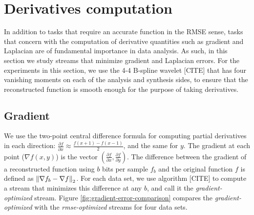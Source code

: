 \section{Derivatives computation}

In addition to tasks that require an accurate function in the RMSE sense, tasks that concern with
the computation of derivative quantities such as gradient and Laplacian are of fundamental
importance in data analysis. As such, in this section we study streams that minimize gradient and
Laplacian errors. For the experiments in this section, we use the 4-4 B-spline wavelet [CITE] that
has four vanishing moments on each of the analysis and synthesis sides, to ensure that the
reconstructed function is smooth enough for the purpose of taking derivatives.

\subsection{Gradient}

We use the two-point central difference formula for computing partial derivatives in each
direction: $\frac{\partial f}{\partial x}\approx \frac{f(x+1)-f(x-1)}{2}$, and the same for $y$. The
gradient at each point ($\nabla f(x,y)$) is the vector $(\frac{\partial f}{\partial
x},\frac{\partial f}{\partial y})$. The difference between the gradient of a reconstructed function
using $b$ bits per sample $f_b$ and the original function $f$ is defined as $\left\lVert\nabla f_b-\nabla
f\right\rVert_2$. For each data set, we use algorithm [CITE] to compute a stream that minimizes this difference
at any $b$, and call it the \emph{gradient-optimized} stream. Figure
\ref{fig:gradient-error-comparison} compares the \emph{gradient-optimized} with the
\emph{rmse-optimized} streams for four data sets.

